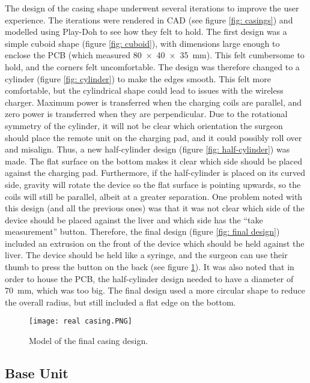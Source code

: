 The design of the casing shape underwent several iterations to improve the user experience. The iterations were rendered in CAD (see figure \ref{fig: casings}) and modelled using Play-Doh to see how they felt to hold. The first design was a simple cuboid shape (figure \ref{fig: cuboid}), with dimensions large enough to enclose the PCB (which measured \SI{80x40x35}{\milli\metre}). This felt cumbersome to hold, and the corners felt uncomfortable. The design was therefore changed to a cylinder (figure \ref{fig: cylinder}) to make the edges smooth. This felt more comfortable, but the cylindrical shape could lead to issues with the wireless charger. Maximum power is transferred when the charging coils are parallel, and zero power is transferred when they are perpendicular. Due to the rotational symmetry of the cylinder, it will not be clear which orientation the surgeon should place the remote unit on the charging pad, and it could possibly roll over and misalign. Thus, a new half-cylinder design (figure \ref{fig: half-cylinder}) was made. The flat surface on the bottom makes it clear which side should be placed against the charging pad. Furthermore, if the half-cylinder is placed on its curved side, gravity will rotate the device so the flat surface is pointing upwards, so the coils will still be parallel, albeit at a greater separation. One problem noted with this design (and all the previous ones) was that it was not clear which side of the device should be placed against the liver and which side has the ``take measurement'' button. Therefore, the final design (figure \ref{fig: final design}) included an extrusion on the front of the device which should be held against the liver. The device should be held like a syringe, and the surgeon can use their thumb to press the button on the back (see figure \ref{fig: real casing}). It was also noted that in order to house the PCB, the half-cylinder design needed to have a diameter of \SI{70}{\milli\metre}, which was too big. The final design used a more circular shape to reduce the overall radius, but still included a flat edge on the bottom.

\begin{figure}[htb]
	\centering
	\texttt{[image: real casing.PNG]}
	\caption{Model of the final casing design.}
	\label{fig: real casing}
\end{figure}





\subsection{Base Unit}\label{base casing}


